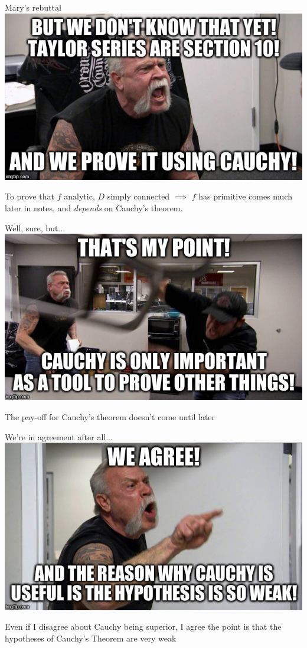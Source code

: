 \documentclass{beamer}
\begin{document}
\begin{frame}{Mary's rebuttal}\includegraphics[width=\textwidth,height=0.8\textheight,keepaspectratio]{ChopperFilled3.jpg}
  
To prove that $f$ analytic, $D$ simply connected $\implies$ $f$ has primitive comes much later in notes, and \emph{depends} on Cauchy's theorem.
\end{frame}
\begin{frame}{Well, sure, but...}\includegraphics[width=\textwidth,height=0.8\textheight,keepaspectratio]{ChopperFilled4.jpg}

  The pay-off for Cauchy's theorem doesn't come until later
\end{frame}
\begin{frame}{We're in agreement after all...}\includegraphics[width=\textwidth,height=0.8\textheight,keepaspectratio]{ChopperFilled5.jpg}
  
Even if I disagree about Cauchy being superior, I agree the point is that the hypotheses of Cauchy's Theorem are very weak
\end{frame}
\end{document}
